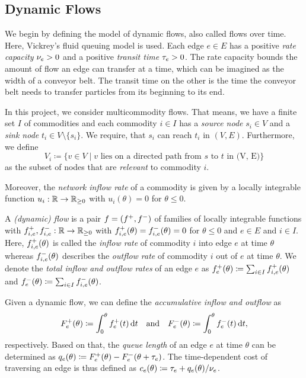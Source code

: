 \subsection{Dynamic Flows}\label{subsec:dynamic-flows}

We begin by defining the model of dynamic flows, also called flows over time.
Here, Vickrey's fluid queuing model is used.
Each edge $e\in E$ has a positive \emph{rate capacity} $\nu_e > 0$ and a positive \emph{transit time} $\tau_e > 0$.
The rate capacity bounds the amount of flow an edge can transfer at a time, which can be imagined as the width of a conveyor belt.
The transit time on the other is the time the conveyor belt needs to transfer particles from its beginning to its end.

In this project, we consider multicommodity flows.
That means, we have a finite set $I$ of commodities and each commodity $i\in I$ has a \emph{source node} $s_i\in V$ and a \emph{sink node} $t_i\in V\setminus\{ s_i \}$.
We require, that $s_i$ can reach $t_i$ in $(V,E)$.
Furthermore, we define \[
    V_i \coloneqq \{ v \in V \mid \text{$v$ lies on a directed path from $s$ to $t$ in (V, E)} \}
\]
as the subset of nodes that are \emph{relevant} to commodity $i$.

Moreover, the \emph{network inflow rate} of a commodity is given by a locally integrable function $u_i:\mathbb{R} \rightarrow \mathbb{R}_{\geq 0}$ with $u_i(\theta) = 0$ for $\theta \leq 0$.

\begin{definition}
    A \emph{(dynamic) flow} is a pair $f = ({f}^+, {f}^-)$ of families of locally integrable functions with ${f}^+_{i,e}, {f}^-_{i,e} : \mathbb{R} \rightarrow \mathbb{R}_{\geq 0}$ with ${f}^+_{i,e}(\theta) = {f}^-_{i,e}(\theta) = 0$ for $\theta \leq 0$ and  $e\in E$ and $i\in I$.
    Here, ${f}^+_{i,e}(\theta)$ is called the \emph{inflow rate} of commodity $i$ into edge $e$ at time $\theta$ whereas ${f}^-_{i,e}(\theta)$ describes the \emph{outflow rate} of commodity $i$ out of $e$ at time $\theta$.
    We denote the \emph{total inflow and outflow rates} of an edge $e$ as ${f}^+_e(\theta) \coloneqq \sum_{i\in I} {f}^+_{i,e}(\theta)$ and ${f}^-_e(\theta) \coloneqq \sum_{i\in I}{f}^-_{i,e}(\theta)$.

    Given a dynamic flow, we can define the \emph{accumulative inflow and outflow} as
    \[
        F^+_e(\theta) \coloneqq \int_0^\theta {f}^+_e(t) \,\textnormal{d} t \quad\text{and}\quad  F^-_e(\theta) \coloneqq \int_0^\theta {f}^-_e(t) \,\textnormal{d} t,
    \]
    respectively.
    Based on that, the \emph{queue length} of an edge $e$ at time $\theta$ can be determined as $q_e(\theta) \coloneqq F^+_e(\theta) - F^-_e(\theta + \tau_e)$.
    The time-dependent cost of traversing an edge is thus defined as $c_e(\theta) \coloneqq \tau_e + q_e(\theta) / \nu_e$.
\end{definition}

